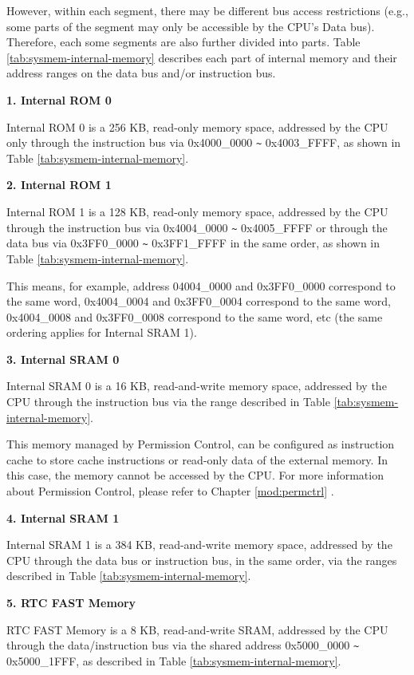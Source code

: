 \documentclass[main\_\_EN.tex]{subfiles}
\begin{document}
However, within each segment, there may be different bus access restrictions (e.g., some parts of the segment may only be accessible by the CPU's Data bus). Therefore, each some segments are also further divided into parts. Table \ref{tab:sysmem-internal-memory} describes each part of internal memory and their address ranges on the data bus and/or instruction bus. 



{\bfseries 1. Internal ROM 0}

Internal ROM 0 is a 256 KB, read-only memory space, addressed by the CPU only through the instruction bus via 0x4000\_0000 \verb+~+ 0x4003\_FFFF, as shown in Table \ref{tab:sysmem-internal-memory}.

{\bfseries 2. Internal ROM 1}

Internal ROM 1 is a 128 KB, read-only memory space, addressed by the CPU through the instruction bus via 0x4004\_0000 \verb+~+ 0x4005\_FFFF or through the data bus via 0x3FF0\_0000 \verb+~+ 0x3FF1\_FFFF in the same order, as shown in Table \ref{tab:sysmem-internal-memory}.

This means, for example, address 04004\_0000 and 0x3FF0\_0000 correspond to the same word, 0x4004\_0004 and 0x3FF0\_0004 correspond to the same word, 0x4004\_0008 and 0x3FF0\_0008 correspond to the same word, etc (the same ordering applies for Internal SRAM 1).

{\bfseries 3. Internal SRAM 0}
\label{other:sysmem-internal-sram-0}

Internal SRAM 0 is a 16 KB, read-and-write memory space, addressed by the CPU through the instruction bus via the range described in Table \ref{tab:sysmem-internal-memory}.

This memory managed by Permission Control, can be configured as instruction cache to store cache instructions or read-only data of the external memory. In this case, the memory cannot be accessed by the CPU. For more information about Permission Control, please refer to Chapter \ref{mod:permctrl} \textit{}.


{\bfseries 4. Internal SRAM 1}

Internal SRAM 1 is a 384 KB, read-and-write memory space, addressed by the CPU through the data bus or instruction bus, in the same order, via the ranges described in Table \ref{tab:sysmem-internal-memory}.


{\bfseries 5. RTC FAST Memory}

RTC FAST Memory is a 8 KB, read-and-write SRAM, addressed by the CPU through the data/instruction bus via the shared address 0x5000\_0000 \verb+~+ 0x5000\_1FFF, as described in Table \ref{tab:sysmem-internal-memory}.
\end{document}
